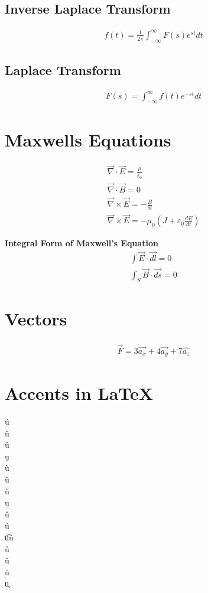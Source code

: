 \documentclass{article}
\begin{document}
\subsection{Inverse Laplace Transform}
\begin{eqnarray}
f(t) = \frac{1}{2\pi}\int_{-\infty}^{\infty}F(s)e^{st}dt
\end{eqnarray}

\subsection{Laplace Transform}
\begin{eqnarray}
F(s) = \int_{-\infty}^{\infty}f(t)e^{-st}dt
\end{eqnarray}

\section{Maxwells Equations}
\begin{eqnarray}
\overrightarrow{\nabla}\cdot\overrightarrow{E} = \frac{\rho}{\varepsilon_0}\\
\overrightarrow{\nabla}\cdot\overrightarrow{B} = 0\\
\overrightarrow{\nabla}\times\overrightarrow{E} = -\frac{B}{\delta t}\\
\overrightarrow{\nabla}\times\overrightarrow{E} = -\mu_0(J + \varepsilon_0\frac{dE}{dt}) 
\end{eqnarray}

\textbf{Integral Form of Maxwell's Equation}
\begin{eqnarray}
\int\overrightarrow{E}\cdot\overrightarrow{dl} = 0\\
\int_S\overrightarrow{B}\cdot\overrightarrow{ds} = 0 
\end{eqnarray}

\section{Vectors}
\begin{eqnarray}
\overrightarrow{F} = 3\overrightarrow{a_x}+4\overrightarrow{a_y} + 7\hat{a_z}
\end{eqnarray}

\section{Accents in \LaTeX}
\begin{center}
\'{u}\\
\"{u}\\
\v{u}\\
\d{u}\\
\`{u}\\
\={u}\\
\H{u}\\
\b{u}\\
\^{u}\\
\.{u}\\
\t{uu}\\
\r{u}\\
\~{u}\\
\u{u}\\
\c{u}
\end{center}
\end{document}
